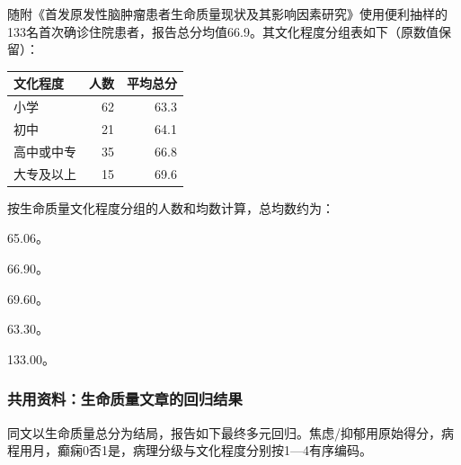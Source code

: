 随附《首发原发性脑肿瘤患者生命质量现状及其影响因素研究》使用便利抽样的133名首次确诊住院患者，报告总分均值66.9。其文化程度分组表如下（原数值保留）：

\begin{center}\small\setlength{\tabcolsep}{3.5pt}\renewcommand{\arraystretch}{1.18}\begin{tabular}{@{}lrr@{}}
\toprule
文化程度 & 人数 & 平均总分 \\
\midrule

小学 & 62 & 63.3 \\
初中 & 21 & 64.1 \\
高中或中专 & 35 & 66.8 \\
大专及以上 & 15 & 69.6 \\
\bottomrule\end{tabular}\end{center}


\par\addvspace{6pt}\noindent\begin{minipage}{\linewidth}


按生命质量文化程度分组的人数和均数计算，总均数约为：


\begin{choices}

\item 65.06。

\item 66.90。

\item 69.60。

\item 63.30。

\item 133.00。

\end{choices}

\end{minipage}\par\vspace{4pt}

\subsubsection*{共用资料：生命质量文章的回归结果}

同文以生命质量总分为结局，报告如下最终多元回归。焦虑/抑郁用原始得分，病程用月，癫痫0否1是，病理分级与文化程度分别按1---4有序编码。

